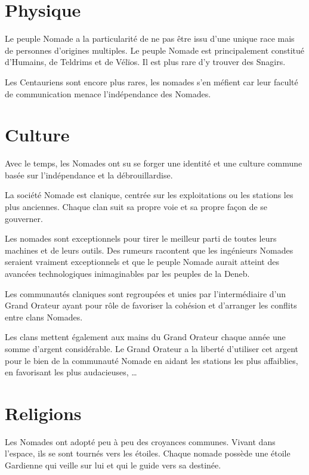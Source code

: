 \begin{multicols}{2}

\section{Physique}

Le peuple Nomade a la particularité de ne pas être issu d'une unique race mais de personnes d'origines multiples. Le peuple Nomade est principalement constitué d'Humains, de Teldrims et de Vélïos. Il est plus rare d'y trouver des Snagirs. 

Les Centauriens sont encore plus rares, les nomades s'en méfient car leur faculté de communication menace l'indépendance des Nomades.

\section{Culture}

Avec le temps, les Nomades ont su se forger une identité et une culture commune basée sur l'indépendance et la débrouillardise.

La société Nomade est clanique, centrée sur les exploitations ou les stations les plus anciennes. Chaque clan suit sa propre voie et sa propre façon de se gouverner. 

Les nomades sont exceptionnels pour tirer le meilleur parti de toutes leurs machines et de leurs outils. Des rumeurs racontent que les ingénieurs Nomades seraient vraiment exceptionnels et que le peuple Nomade aurait atteint des avancées technologiques inimaginables par les peuples de la Deneb.

Les communautés claniques sont regroupées et unies par l'intermédiaire d'un Grand Orateur ayant pour rôle de favoriser la cohésion et d'arranger les conflits entre clans Nomades.

Les clans mettent également aux mains du Grand Orateur chaque année une somme d'argent considérable. Le Grand Orateur a la liberté d'utiliser cet argent pour le bien de la communauté Nomade en aidant les stations les plus affaiblies, en favorisant les plus audacieuses, …

\section{Religions}

Les Nomades ont adopté peu à peu des croyances communes. Vivant dans l'espace, ils se sont tournés vers les étoiles. Chaque nomade possède une étoile Gardienne qui veille sur lui et qui le guide vers sa destinée.


\end{multicols}
